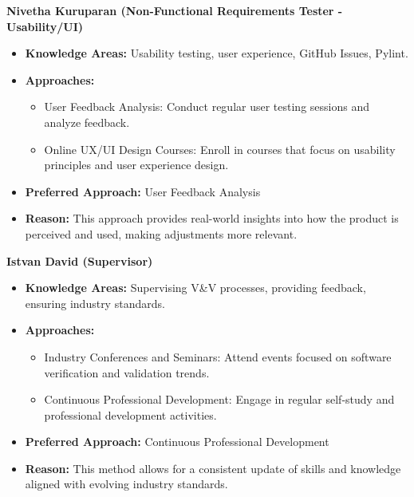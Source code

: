 \documentclass[12pt, titlepage]{article}
\begin{document}
\begin{appendices}
\begin{itemize}
        \textbf{Nivetha Kuruparan (Non-Functional Requirements Tester
        - Usability/UI)}
        \begin{itemize}
          \item \textbf{Knowledge Areas:} Usability testing, user
            experience, GitHub Issues, Pylint.
          \item \textbf{Approaches:}
            \begin{itemize}
              \item User Feedback Analysis: Conduct regular user
                testing sessions and analyze feedback.
              \item Online UX/UI Design Courses: Enroll in courses
                that focus on usability principles and user experience design.
            \end{itemize}
          \item \textbf{Preferred Approach:} User Feedback Analysis
          \item \textbf{Reason:} This approach provides real-world
            insights into how the product is perceived and used,
            making adjustments more relevant.
        \end{itemize}

        \textbf{Istvan David (Supervisor)}
        \begin{itemize}
          \item \textbf{Knowledge Areas:} Supervising V\&V processes,
            providing feedback, ensuring industry standards.
          \item \textbf{Approaches:}
            \begin{itemize}
              \item Industry Conferences and Seminars: Attend events
                focused on software verification and validation trends.
              \item Continuous Professional Development: Engage in
                regular self-study and professional development activities.
            \end{itemize}
          \item \textbf{Preferred Approach:} Continuous Professional Development
          \item \textbf{Reason:} This method allows for a consistent
            update of skills and knowledge aligned with evolving
            industry standards.
        \end{itemize}

    \end{itemize}

  \end{appendices}

  
\end{document}
